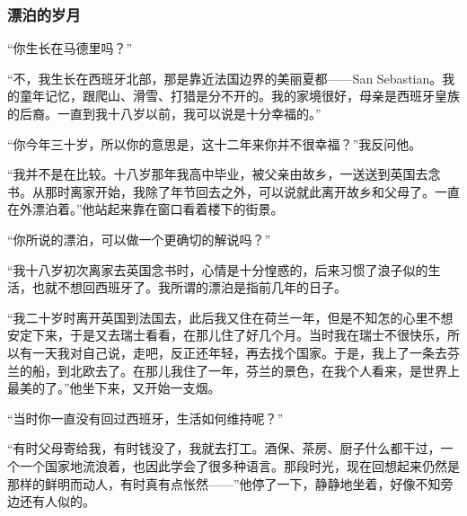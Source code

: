 \subsubsection*{漂泊的岁月}
\par “你生长在马德里吗？”
\par “不，我生长在西班牙北部，那是靠近法国边界的美丽夏都——San Sebastian。我的童年记忆，跟爬山、滑雪、打猎是分不开的。我的家境很好，母亲是西班牙皇族的后裔。一直到我十八岁以前，我可以说是十分幸福的。”
\par “你今年三十岁，所以你的意思是，这十二年来你并不很幸福？”我反问他。
\par “我并不是在比较。十八岁那年我高中毕业，被父亲由故乡，一送送到英国去念书。从那时离家开始，我除了年节回去之外，可以说就此离开故乡和父母了。一直在外漂泊着。”他站起来靠在窗口看着楼下的街景。
\par “你所说的漂泊，可以做一个更确切的解说吗？”
\par “我十八岁初次离家去英国念书时，心情是十分惶惑的，后来习惯了浪子似的生活，也就不想回西班牙了。我所谓的漂泊是指前几年的日子。
\par “我二十岁时离开英国到法国去，此后我又住在荷兰一年，但是不知怎的心里不想安定下来，于是又去瑞士看看，在那儿住了好几个月。当时我在瑞士不很快乐，所以有一天我对自己说，走吧，反正还年轻，再去找个国家。于是，我上了一条去芬兰的船，到北欧去了。在那儿我住了一年，芬兰的景色，在我个人看来，是世界上最美的了。”他坐下来，又开始一支烟。
\par “当时你一直没有回过西班牙，生活如何维持呢？”
\par “有时父母寄给我，有时钱没了，我就去打工。酒保、茶房、厨子什么都干过，一个一个国家地流浪着，也因此学会了很多种语言。那段时光，现在回想起来仍然是那样的鲜明而动人，有时真有点怅然——”他停了一下，静静地坐着，好像不知旁边还有人似的。
